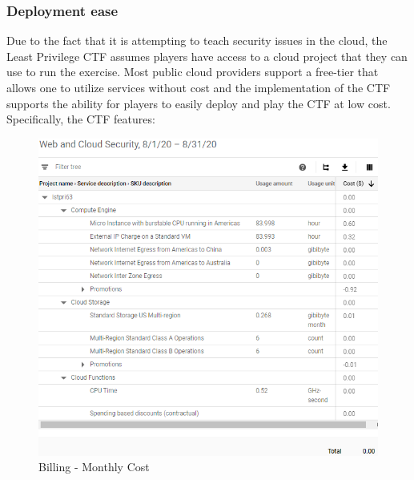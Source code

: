\subsubsection{Deployment ease}
Due to the fact that it is attempting to teach security issues in the cloud,
the Least Privilege CTF assumes players have access to a cloud project that they can use to run
the exercise.  Most public cloud providers support a free-tier that allows one to utilize services without cost and the implementation
of the CTF supports the ability for players to easily deploy and play the CTF at low cost.   Specifically, the CTF features:
\begin{figure}[!h]
  \centering
  \includegraphics[width=\linewidth]{pic/cost}
  \caption {Billing - Monthly Cost}
  \label{fig:cost}
\end{figure}

